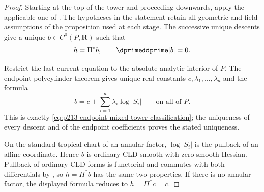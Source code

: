 \begin{proof}
Starting at the top of the tower and proceeding downwards, apply the
applicable one of
.
The hypotheses in the statement retain all geometric and field assumptions
of the proposition used at each stage.  The successive unique descents give
a unique \(b\in C^0(P,\mathbf R)\) such that
\[
                         h=\Pi^*b,
                         \qquad \dprimeddprime[b]=0.
\]

Restrict the last current equation to the absolute analytic interior of
\(P\).  The endpoint-polycylinder theorem
 gives unique real constants
\(c,\lambda_1,\ldots,\lambda_a\) and the formula
\[
                   b=c+\sum_{i=1}^a\lambda_i\log|S_i|
                   \qquad\text{on all of }P.
\]
This is exactly \eqref{eq:p213-endpoint-mixed-tower-classification}; the
uniqueness of every descent and of the endpoint coefficients proves the
stated uniqueness.

On the standard tropical chart of an annular factor, \(\log|S_i|\) is the
pullback of an affine coordinate.  Hence \(b\) is ordinary CLD-smooth with
zero smooth Hessian.  Pullback of ordinary CLD forms is functorial and
commutes with both differentials by , so
\(h=\Pi^*b\) has the same two properties.  If there is no annular factor,
the displayed formula reduces to \(h=\Pi^*c=c\).
\end{proof}
